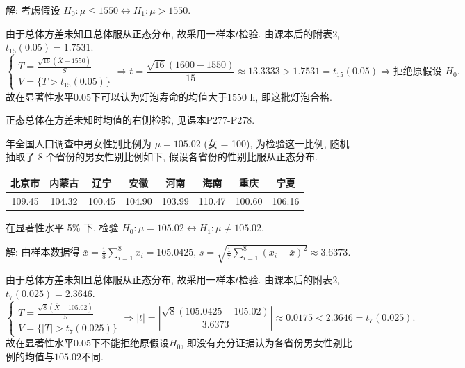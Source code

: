 \documentclass[standard]{ExBook}
\renewenvironment{shaded}{%
  \def\FrameCommand{\fboxsep=\FrameSep \colorbox{shadecolor}}%
  \MakeFramed{\advance\hsize-\width \FrameRestore}%
}{%
  \endMakeFramed
}
\begin{document}
\begin{qitems}
解: 考虑假设
$
H_0:\mu\leq1550
\longleftrightarrow
H_1:\mu>1550
$.

由于总体方差未知且总体服从正态分布, 故采用一样本$t$检验. 由课本后的附表2, $t_{15}(0.05)=1.7531$.
$$
\left\{
\begin{array}{l}
\displaystyle
T=\frac{\sqrt{16}(\overline{X}-1550)}{S}\\
V=\{T>t_{15}(0.05)\}
\end{array}
\right.
\Longrightarrow
t
=\frac{\sqrt{16}(1600-1550)}{15}
\approx13.3333
>1.7531=t_{15}(0.05)
\Longrightarrow
\text{拒绝原假设 }H_0.
$$
故在显著性水平$0.05$下可以认为灯泡寿命的均值大于$1550$ h, 即这批灯泡合格.

\textcolor{themeColor}{\selectfont {} 正态总体在方差未知时均值的右侧检验, 见课本P277-P278.}

\vspace{2.5cm-5em}

    \begin{bbox}
    \begin{shaded}
         年全国人口调查中男女性别比例为 $\mu = 105.02$ (女 = 100), 为检验这一比例, 随机抽取了 8 个省份的男女性别比例如下, 假设各省份的性别比服从正态分布.
\begin{center}
\setlength{\tabcolsep}{12pt}
\begin{tabular}{cccccccc}
\hline
北京市 & 内蒙古 & 辽宁 & 安徽 & 河南 & 海南 & 重庆 & 宁夏 \\
\hline
109.45 & 104.32 & 100.45 & 104.90 & 103.99 & 110.47 & 100.60 & 106.16 \\
\hline
\end{tabular}
\end{center}
在显著性水平 5\% 下, 检验 $H_0 : \mu = 105.02 \longleftrightarrow H_1 : \mu \neq 105.02$.
    \end{shaded}
    \end{bbox}

\vspace{\dimexpr2.5cm-5em\relax}

解: 由样本数据得
$
\bar{x}
=\frac{1}{8}\sum_{i=1}^{8}x_i
=105.0425
$,
$
s
=\sqrt{\frac{1}{7}\sum_{i=1}^{8}(x_i-\bar{x})^2}
\approx3.6373
$.

由于总体方差未知且总体服从正态分布, 故采用一样本$t$检验. 由课本后的附表2, $t_7(0.025)=2.3646$.
$$
\left\{
\begin{array}{l}
\displaystyle
T=\frac{\sqrt{8}(\overline{X}-105.02)}{S}\\
V=\{|T|>t_7(0.025)\}
\end{array}
\right.
\Longrightarrow
|t|
=\left|\frac{\sqrt{8}(105.0425-105.02)}{3.6373}\right|
\approx0.0175
<2.3646=t_7(0.025).
$$
故在显著性水平$0.05$下不能拒绝原假设$H_0$, 即没有充分证据认为各省份男女性别比例的均值与$105.02$不同.


\end{qitems}
\end{document}
